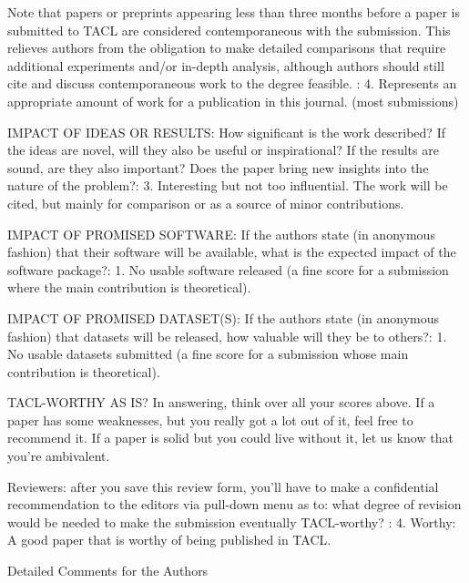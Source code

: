 \documentclass[11pt,a4paper]{article}
\begin{document}
Note that papers or preprints appearing less than three months before a
paper is submitted to TACL are considered contemporaneous with the
submission. This relieves authors from the obligation to make detailed
comparisons that require additional experiments and/or in-depth analysis,
although authors should still cite and discuss contemporaneous work to the
degree feasible.
:
        4. Represents an appropriate amount of work for a publication in this
journal. (most submissions)

IMPACT OF IDEAS OR RESULTS: How significant is the work described? If the
ideas are novel, will they also be useful or inspirational? If the results
are sound, are they also important? Does the paper bring new insights into
the nature of the problem?:
        3. Interesting but not too influential. The work will be cited, but mainly
for comparison or as a source of minor contributions.

IMPACT OF PROMISED SOFTWARE: If the authors state (in anonymous fashion)
that their software will be available, what is the expected impact of the
software package?:
        1. No usable software released (a fine score for a submission where the
main contribution is theoretical).

IMPACT OF PROMISED DATASET(S): If the authors state (in anonymous fashion)
that datasets will be released, how valuable will they be to others?:
        1. No usable datasets submitted (a fine score for a submission whose main
contribution is theoretical).


TACL-WORTHY AS IS? In answering, think over all your scores above. If a
paper has some weaknesses, but you really got a lot out of it, feel free to
recommend it. If a paper is solid but you could live without it, let us know
that you're ambivalent.

Reviewers: after you save this review form, you'll have to make a
confidential recommendation to the editors via pull-down menu as to: what
degree of revision would be needed to make the submission eventually
TACL-worthy?
:
        4. Worthy: A good paper that is worthy of being published in TACL.


Detailed Comments for the Authors
\end{document}
